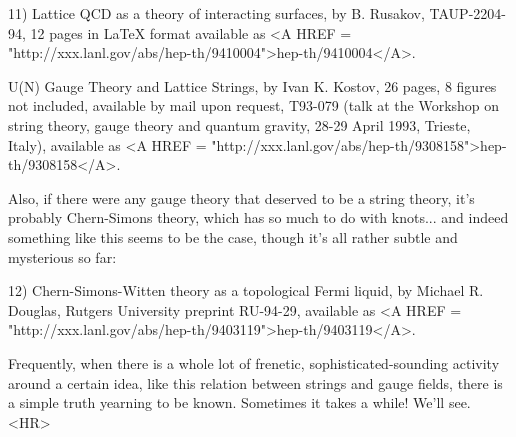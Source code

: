 11) Lattice QCD as a theory of interacting surfaces, by B. Rusakov,
TAUP-2204-94, 12 pages in LaTeX format available as <A HREF = "http://xxx.lanl.gov/abs/hep-th/9410004">hep-th/9410004</A>.

U(N) Gauge Theory and Lattice Strings, by Ivan K. Kostov, 26 pages, 8
figures not included, available by mail upon request, T93-079 (talk at
the Workshop on string theory, gauge theory and quantum gravity, 28-29
April 1993, Trieste, Italy), available as <A HREF = "http://xxx.lanl.gov/abs/hep-th/9308158">hep-th/9308158</A>.  

Also, if there were any gauge theory that deserved to be a string
theory, it's probably Chern-Simons theory, which has so much to do with
knots... and indeed something like this seems to be the case, though
it's all rather subtle and mysterious so far:

12) Chern-Simons-Witten theory as a topological Fermi liquid, by Michael
R. Douglas, Rutgers University preprint RU-94-29, available as
<A HREF = "http://xxx.lanl.gov/abs/hep-th/9403119">hep-th/9403119</A>. 

Frequently, when there is a whole lot of frenetic, sophisticated-sounding
activity around a certain idea, like this relation between strings and
gauge fields, there is a simple truth yearning to be known.  Sometimes
it takes a while!  We'll see.
<HR>



